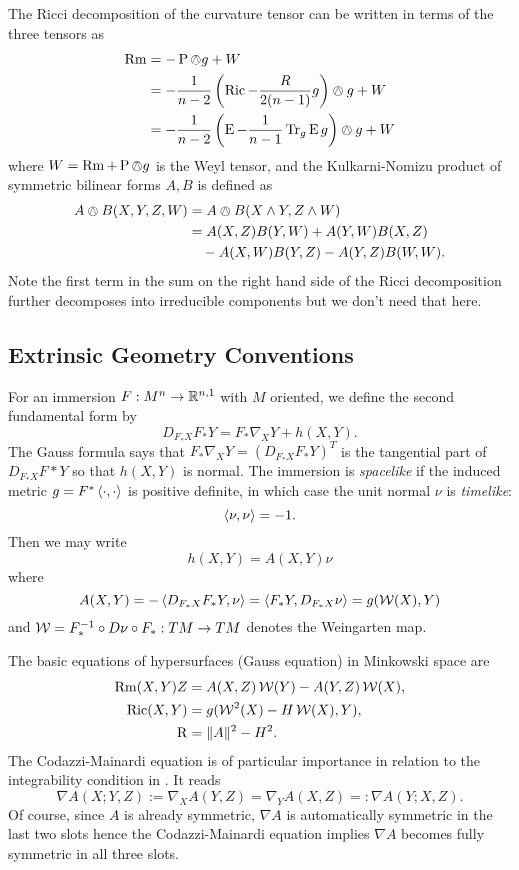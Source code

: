 \documentclass[a4paper, 12pt]{amsart}
\begin{document}
The Ricci decomposition of the curvature tensor can be written in terms of the three tensors as
\begin{align*}
\operatorname{Rm} &= -\operatorname{P} \owedge g + W \\
&= -\frac{1}{n-2} \left(\operatorname{Ric} - \frac{R}{2(n-1)} g\right) \owedge g + W \\
&= -\frac{1}{n-2} \left(\operatorname{E}  -\frac{1}{n-1} \operatorname{Tr}_g \operatorname{E} g\right) \owedge g + W
\end{align*}
where \(W = \operatorname{Rm} + \operatorname{P} \owedge g\) is the Weyl tensor, and the Kulkarni-Nomizu product of symmetric bilinear forms \(A, B\) is defined as
\[
\begin{split}
A \owedge B (X, Y, Z, W) &= A \owedge B (X \wedge Y, Z \wedge W) \\
&= A(X, Z) B(Y, W) + A(Y, W) B(X, Z) \\
&\quad - A(X, W) B(Y, Z) - A(Y, Z) B(W, W).
\end{split}
\]
Note the first term in the sum on the right hand side of the Ricci decomposition further decomposes into irreducible components but we don't need that here.
\subsection{Extrinsic Geometry Conventions}
\label{subsec:notation_extrinsic}
For an immersion \(F : M^n \to \mathbb{R}^{n,1}\) with \(M\) oriented, we define the second fundamental form by
\[
D_{F_{\ast} X} F_{\ast} Y = F_{\ast} \nabla_X Y + h(X, Y).
\]
The Gauss formula says that \(F_{\ast} \nabla_X Y = (D_{F_{\ast} X} F_{\ast} Y)^T\) is the tangential part of \(D_{F_{\ast} X} F{\ast} Y\) so that \(h(X, Y)\) is normal. The immersion is \emph{spacelike} if the induced metric \(g = F^{\ast} \left\langle \cdot,\cdot \right\rangle\) is positive definite, in which case the unit normal \(\nu\) is \emph{timelike}:
\[
\left\langle \nu,\nu \right\rangle = -1.
\]
Then we may write
\[
h(X, Y) = A(X, Y) \nu
\]
where
\[
A(X, Y) = -\left\langle D_{F_{\ast} X} F_{\ast} Y,\nu \right\rangle = \left\langle F_{\ast} Y,D_{F_{\ast} X} \nu \right\rangle = g(\operatorname{\mathcal{W}}(X), Y)
\]
and \(\operatorname{\mathcal{W}} = F_{\ast}^{-1} \circ D\nu \circ F_{\ast}: TM \to TM\) denotes the Weingarten map.

The basic equations of hypersurfaces (Gauss equation) in Minkowski space are
\begin{equation}
\label{eq:gauss}
\begin{split}
\operatorname{Rm}(X, Y) Z &= A(X, Z) \operatorname{\mathcal{W}}(Y) - A(Y, Z) \operatorname{\mathcal{W}}(X), \\
\operatorname{Ric}(X, Y) &= g(\operatorname{\mathcal{W}}^2(X) - H \operatorname{\mathcal{W}}(X), Y), \\
\operatorname{R} &= \|A\|^2 - H^2.
\end{split}
\end{equation}
The Codazzi-Mainardi equation is of particular importance in relation to the integrability condition in . It reads
\begin{equation}
\label{eq:codazzi}
\nabla A (X; Y, Z) := \nabla_X A (Y, Z) = \nabla_Y A(X, Z) =: \nabla A(Y; X, Z).
\end{equation}
Of course, since \(A\) is already symmetric, \(\nabla A\) is automatically symmetric in the last two slots hence the Codazzi-Mainardi equation implies \(\nabla A\) becomes fully symmetric in all three slots.
\end{document}

